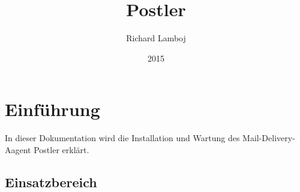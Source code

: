 \documentclass[a4paper,10pt]{article}
\title{Postler}
\author{Richard Lamboj}
\date{2015}
\begin{document}
\pagestyle{plain} %

\thispagestyle{empty}
\mbox{}

\maketitle
\tableofcontents
\newpage

\section{Einführung}

In dieser Dokumentation wird die Installation und Wartung des Mail-Delivery-Aagent Postler erklärt.

\subsection{Einsatzbereich}
\end{document}
